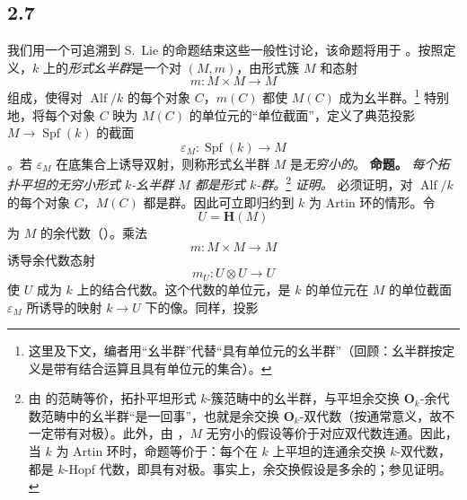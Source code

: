 
\subsection*{2.7}
\label{sga3:VIIB:2.7}
我们用一个可追溯到 S.~Lie 的命题结束这些一般性讨论，该命题将用于 。按照定义，\(k\) 上的\emph{形式幺半群}是一个对 \((M,m)\)，由形式簇 \(M\) 和态射
\[
  m:M\times M\longrightarrow M
\]
组成，使得对 \(\operatorname{Alf}/k\) 的每个对象 \(C\)，\(m(C)\) 都使 \(M(C)\) 成为幺半群。\footnote{%
\label{sga3:VIIB:nde:112}这里及下文，编者用“幺半群”代替“具有单位元的幺半群”\textup{（回顾：幺半群按定义是带有结合运算且具有单位元的集合）}。}
特别地，将每个对象 \(C\) 映为 \(M(C)\) 的单位元的“单位截面”，定义了典范投影 \(M\to\operatorname{Spf}(k)\) 的截面
\[
  \varepsilon_M:\operatorname{Spf}(k)\longrightarrow M
\]
。若 \(\varepsilon_M\) 在底集合上诱导双射，则称形式幺半群 \(M\) 是\emph{无穷小的}。
\medskip
\noindent\textbf{命题。}
\label{sga3:VIIB:2.7:prop}
{\itshape 每个拓扑平坦的无穷小形式 \(k\)-幺半群 \(M\) 都是形式 \(k\)-群。}\footnote{%
\label{sga3:VIIB:nde:113}由  的范畴等价，拓扑平坦形式 \(k\)-簇范畴中的幺半群，与平坦余交换 \(\mathbf O_k\)-余代数范畴中的幺半群“是一回事”，也就是余交换 \(\mathbf O_k\)-双代数\textup{（按通常意义，故不一定带有对极）}。此外，由 ，\(M\) 无穷小的假设等价于对应双代数连通。因此，当 \(k\) 为 Artin 环时，命题等价于：每个在 \(k\) 上平坦的连通余交换 \(k\)-双代数，都是 \(k\)-Hopf 代数，即具有对极。事实上，余交换假设是多余的；参见证明。}
\textit{证明。}
必须证明，对 \(\operatorname{Alf}/k\) 的每个对象 \(C\)，\(M(C)\) 都是群。因此可立即归约到 \(k\) 为 Artin 环的情形。令
\[
  U=\mathbf H(M)
\]
为 \(M\) 的余代数\textup{（）}。乘法
\[
  m:M\times M\longrightarrow M
\]
诱导余代数态射
\[
  m_U:U\otimes U\longrightarrow U
\]
使 \(U\) 成为 \(k\) 上的结合代数。这个代数的单位元，是 \(k\) 的单位元在 \(M\) 的单位截面 \(\varepsilon_M\) 所诱导的映射 \(k\to U\) 下的像。同样，投影
